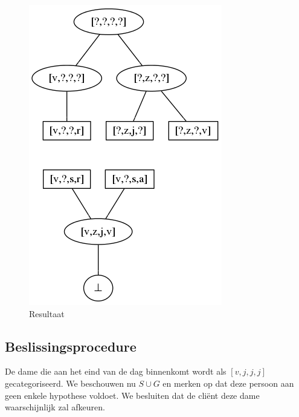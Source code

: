 \documentclass[alternative-exam.tex]{subfiles}
\begin{document}
\begin{figure}
[H]
\centering
\caption{Resultaat}
\label{resultaat}
\includegraphics[scale=0.5]{resources/graphs/resultaat.png}
\end{figure}


\subsection{Beslissingsprocedure}
De dame die aan het eind van de dag binnenkomt wordt als $[v,j,j,j]$ gecategoriseerd.
We beschouwen nu $S\cup G$ en merken op dat deze persoon aan geen enkele hypothese voldoet. We besluiten dat de cli\"ent deze dame waarschijnlijk zal afkeuren.
\end{document}

